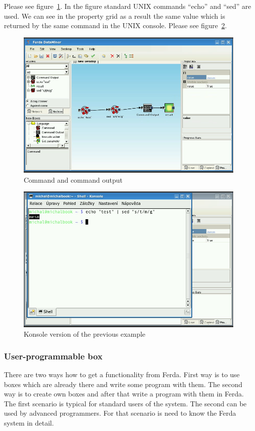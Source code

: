 \documentclass[a4paper,12pt]{book}
\begin{document}
Please see figure~\ref{fig:boxCommand}. In the figure standard UNIX commands ``echo'' and ``sed'' are used. We can see in the property grid as a result the same value which is returned by the same command in the UNIX console. Please see figure~\ref{fig:CommandKonsole}.

\begin{figure}
	\includegraphics[width=1\textwidth]{command2.png}
	\caption{Command and command output}
	\label{fig:boxCommand}
\end{figure}

\begin{figure}
	\includegraphics[width=1\textwidth]{command3.png}
	\caption{Konsole version of the previous example}
	\label{fig:CommandKonsole}
\end{figure}

\subsubsection{User-programmable box}
There are two ways how to get a functionality from Ferda. First way is to use boxes which are already there and write some program with them. The second way is to create own boxes and after that write a program with them in Ferda. The first scenario is typical for standard users of the system. The second can be used by advanced programmers. For that scenario is need to know the Ferda system in detail.
\end{document}

